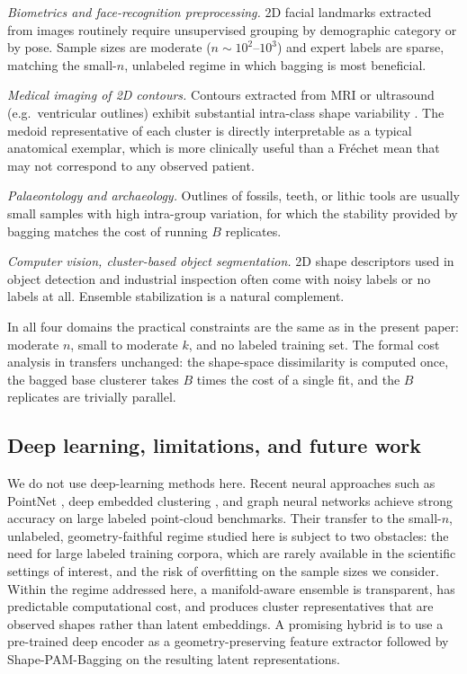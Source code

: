 \documentclass[review,11pt,3p,authoryear]{elsarticle}
\begin{document}
\emph{Biometrics and face-recognition preprocessing.} 2D facial
landmarks extracted from images \citep{schlager2013soft,evison2008magna}
routinely require unsupervised grouping by demographic category or
by pose. Sample sizes are moderate ($n\sim 10^2$--$10^3$) and expert
labels are sparse, matching the small-$n$, unlabeled regime in which
bagging is most beneficial.

\emph{Medical imaging of 2D contours.} Contours extracted from MRI or
ultrasound (e.g.\ ventricular outlines) exhibit substantial
intra-class shape variability
\citep{brignell2010surface,durrleman2014morphometry}. The medoid
representative of each cluster is directly interpretable as a
typical anatomical exemplar, which is more clinically useful than a
Fr\'{e}chet mean that may not correspond to any observed patient.

\emph{Palaeontology and archaeology.} Outlines of fossils, teeth, or
lithic tools \citep{bookstein1986size} are usually small samples
with high intra-group variation, for which the stability provided by
bagging matches the cost of running $B$ replicates.

\emph{Computer vision, cluster-based object segmentation.} 2D shape
descriptors used in object detection and industrial inspection often
come with noisy labels or no labels at all. Ensemble stabilization
is a natural complement.

In all four domains the practical constraints are the same as in the
present paper: moderate $n$, small to moderate $k$, and no labeled
training set. The formal cost analysis in 
transfers unchanged: the shape-space dissimilarity is computed once,
the bagged base clusterer takes $B$ times the cost of a single fit,
and the $B$ replicates are trivially parallel.

\subsection{Deep learning, limitations, and future work}

We do not use deep-learning methods here. Recent neural approaches such
as PointNet \citep{qi2017pointnet}, deep embedded clustering
\citep{xie2016dec}, and graph neural networks \citep{zhou2019review}
achieve strong accuracy on large labeled point-cloud benchmarks. Their
transfer to the small-$n$, unlabeled, geometry-faithful regime studied
here is subject to two obstacles: the need for large labeled training
corpora, which are rarely available in the scientific settings of
interest, and the risk of overfitting on the sample sizes we consider.
Within the regime addressed here, a manifold-aware ensemble is
transparent, has predictable computational cost, and produces cluster
representatives that are observed shapes rather than latent embeddings.
A promising hybrid is to use a pre-trained deep encoder as a
geometry-preserving feature extractor followed by Shape-PAM-Bagging on
the resulting latent representations.
\end{document}
